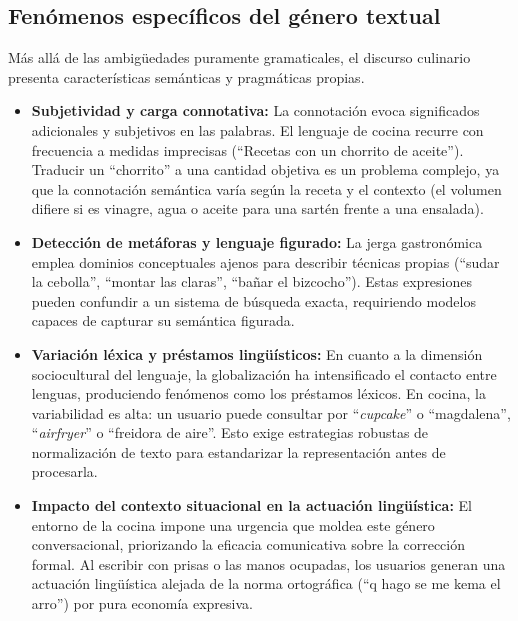 \documentclass[11pt,a4paper,twoside]{article}
\theoremstyle{definition}
\numberwithin{equation}{section}
\begin{document}
\subsection{Fenómenos específicos del género textual}
Más allá de las ambigüedades puramente gramaticales, el discurso culinario presenta características semánticas y pragmáticas propias.
\begin{itemize}
    \item \textbf{Subjetividad y carga connotativa:} La connotación evoca significados adicionales
    y subjetivos en las palabras. El lenguaje de cocina recurre con frecuencia a medidas imprecisas (``Recetas con un chorrito de aceite''). Traducir un ``chorrito'' a una cantidad objetiva es un problema complejo, ya que la connotación semántica varía según la receta y el contexto (el volumen difiere si es vinagre, agua o aceite para una sartén frente a una ensalada). 
     
    \item \textbf{Detección de metáforas y lenguaje figurado:} La jerga gastronómica emplea dominios conceptuales ajenos para describir técnicas propias (``sudar la cebolla'', ``montar las claras'', ``bañar el bizcocho''). Estas expresiones pueden confundir a un sistema de búsqueda exacta, requiriendo modelos capaces de capturar su semántica figurada.
    
    \item \textbf{Variación léxica y préstamos lingüísticos:} En cuanto a la dimensión sociocultural del lenguaje, la globalización ha intensificado el contacto entre lenguas, produciendo fenómenos como los préstamos léxicos. En cocina, la variabilidad es alta: un usuario puede consultar por ``\textit{cupcake}'' o ``magdalena'', ``\textit{airfryer}'' o ``freidora de aire''. Esto exige estrategias robustas de normalización de texto para estandarizar la representación antes de procesarla.
    
    \item \textbf{Impacto del contexto situacional en la actuación lingüística:} El entorno de la cocina impone una urgencia que moldea este género conversacional, priorizando la eficacia comunicativa sobre la corrección formal. Al escribir con prisas o las manos ocupadas, los usuarios generan una actuación lingüística alejada de la norma ortográfica (``q hago se me kema el arro'') por pura economía expresiva.
\end{itemize}
\end{document}
